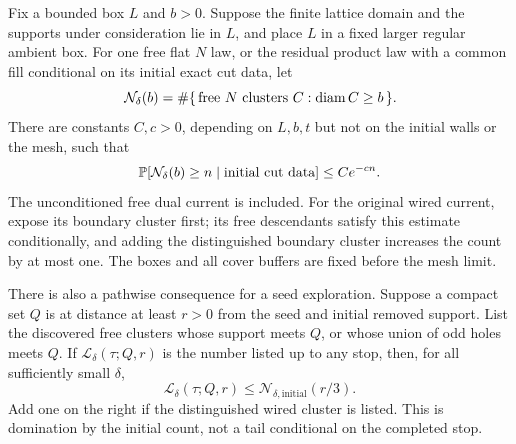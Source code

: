 \begin{corollary}
\label{cor:global-cluster-counts}
Fix a bounded box $L$ and $b>0$. Suppose the finite lattice domain
and the supports under consideration lie in $L$, and place $L$ in
a fixed larger regular ambient box. For one free flat $N$ law, or
the residual product law with a common fill conditional on its initial
exact cut data, let
\[
 \mathcal N_\delta(b)
   =\#\{\,\text{free }N\text{ clusters }C:\diam C\ge b\,\}.
\]
There are constants $C,c>0$, depending on $L,b,t$ but not on the
initial walls or the mesh, such that
\begin{equation}\label{eq:spatial-global-count-tail}
       \P[\mathcal N_\delta(b)\ge n\mid\text{initial cut data}]
                       \le C e^{-cn}.
\end{equation}
The unconditioned free dual current is included. For the original
wired current, expose its boundary cluster first; its free
descendants satisfy this estimate conditionally, and adding the
distinguished boundary cluster increases the count by at most one.
The boxes and all cover buffers are fixed before the mesh limit.

There is also a pathwise consequence for a seed exploration. Suppose
a compact set $Q$ is at distance at least $r>0$ from the seed and
initial removed support. List the discovered free clusters whose
support meets $Q$, or whose union of odd holes meets $Q$. If
$\mathcal L_\delta(\tau;Q,r)$ is the number listed up to any stop,
then, for all sufficiently small $\delta$,
\begin{equation}\label{eq:spatial-contributor-domination}
       \mathcal L_\delta(\tau;Q,r)
                       \le \mathcal N_{\delta,\mathrm{initial}}(r/3).
\end{equation}
Add one on the right if the distinguished wired cluster is listed.
This is domination by the initial count, not a tail conditional on
the completed stop.
\end{corollary}

